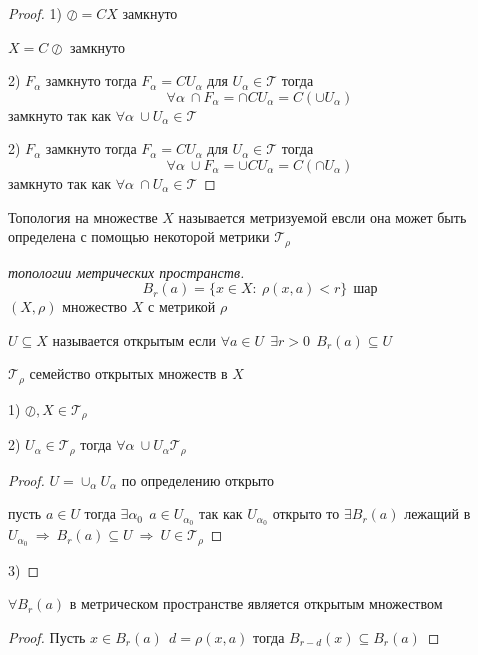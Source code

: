 \begin{proof}
  1) $\oslash = CX$ замкнуто

  $X = C \oslash$ замкнуто

  2) $F_{\alpha}$ замкнуто тогда $F_{\alpha} = CU_{\alpha}$ для
  $U_{\alpha} \in \mathcal{T}$ тогда
  $$
  \forall \alpha ~ \cap F_{\alpha} = \cap CU_{\alpha} = C(\cup U_{\alpha})
  $$
  замкнуто так как $\forall \alpha ~ \cup U_{\alpha} \in \mathcal{T}$

  2) $F_{\alpha}$ замкнуто тогда $F_{\alpha} = CU_{\alpha}$ для
  $U_{\alpha} \in \mathcal{T}$ тогда
  $$
  \forall \alpha ~ \cup F_{\alpha} = \cup CU_{\alpha} = C(\cap U_{\alpha})
  $$
  замкнуто так как $\forall \alpha ~ \cap U_{\alpha} \in \mathcal{T}$
\end{proof}

\begin{define}
  Топология на множестве $X$ называется метризуемой евсли она может быть
  определена с помощью некоторой метрики $\mathcal{T_{\rho}}$
\end{define}

\begin{proof}[топологии метрических пространств]
  $$
  B_r(a) = \{x \in X : ~ \rho(x,a) < r\} ~~ \text{шар}
  $$
  $(X,\rho)$ множество $X$ с метрикой $\rho$

  $U \subseteq X$ называется открытым если $\forall a \in U ~~ \exists r > 0 ~~
  B_r(a) \subseteq U$

  $\mathcal{T}_{\rho}$ семейство открытых множеств в $X$

  1) $\oslash, X \in \mathcal{T}_{\rho}$

  2) $U_{\alpha} \in \mathcal{T}_{\rho}$ тогда $\forall \alpha ~ \cup U_{\alpha}
  \mathcal{T}_{\rho}$

  \begin{proof}
   $U = \cup_{\alpha} U_{\alpha}$ по определению открыто

    пусть $a \in U$ тогда $\exists \alpha_0 ~~
    a \in U_{\alpha_0}$ так как $U_{\alpha_0}$ открыто то $\exists B_r(a)$
    лежащий в $U_{\alpha_0} ~ \Rightarrow ~ B_r (a) \subseteq U ~ \Rightarrow ~
    U \in \mathcal{T}_{\rho}$
  \end{proof}
  3)
\end{proof}

\begin{theorem}
  $\forall B_r(a)$ в метрическом пространстве является открытым множеством
\end{theorem}

\begin{proof}
  Пусть $x \in B_r(a) ~~ d = \rho(x, a)$ тогда $B_{r-d}(x) \subseteq B_r(a)$
\end{proof}


